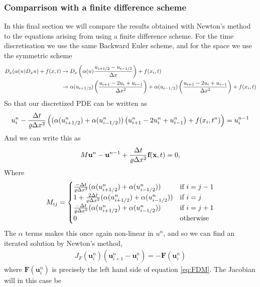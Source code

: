 \documentclass[12pt]{article}
\begin{document}
\subsubsection{Comparrison with a finite difference scheme}
In this final section we will compare the results obtained with Newton's method to the equations arising from using a finite difference scheme. For the time discretisation we use the same Backward Euler scheme, and for the space we use the symmetric scheme
\begin{align}
D_x  (\alpha(u) D_x u) + f(x,t) & \rightarrow D_x \left(\alpha(u) { u_{i+1/2} - u_{i-1/2} \over \Delta x} \right) + f(x_i,t)\\
& \rightarrow \alpha(u_{i+1/2}) \left( {u_{i+1} - 2u_{i} + u_{i-1} \over \Delta x^2} \right) + \alpha(u_{i-1/2})\left( {u_{i+1} - 2u_{i} + u_{i-1} \over \Delta x^2} \right) + f(x_i,t)
\end{align}
So that our discretized PDE can be written as
\begin{align}
 u^n_i - {\Delta t \over \varrho \Delta x^2}\left((\alpha(u_{i+1/2}^n) +\alpha(u_{i-1/2}^n)) \left( {u_{i+1}^n - 2u_{i}^n + u_{i-1}^n} \right) + f(x_i,t^n) \right) = u^{n-1}_i
\end{align}
And we can write this as
\begin{equation}\label{eq:FDM}
 M\textbf{u}^n - \textbf{u}^{n-1} + {\Delta t \over \varrho \Delta x^2}\textbf{f}(\textbf{x},t) = 0,
\end{equation}
Where
\begin{align}
 M_{ij} = \begin{cases}
	   {-\Delta t \over \varrho \Delta x^2}(\alpha(u_{i+1/2}^n) +\alpha(u_{i-1/2}^n)) & \text{if } i = j-1 \\
	   1+{2\Delta t \over \varrho \Delta x^2}(\alpha(u_{i+1/2}^n) +\alpha(u_{i-1/2}^n)) & \text{if } i = j \\
          {-\Delta t \over \varrho \Delta x^2}(\alpha(u_{i+1/2}^n) +\alpha(u_{i-1/2}^n)) & \text{if } i = j+1 \\
          0 & \text{otherwise}
          \end{cases}
\end{align}
The $\alpha$ terms makes this once again non-linear in $u^n$, and so  we can find an iterated solution by Newton's method, 
\begin{align}
 J_F(\textbf{u}_i^n)(\textbf{u}_{i+1}^n - \textbf{u}_{i}^n) = -\textbf{F}(\textbf{u}_i^n) 
\end{align}
where $\textbf{F}(\textbf{u}_i^n)$ is precisely the left hand side of equation \eqref{eq:FDM}. The Jacobian will in this case be 
\end{document}
